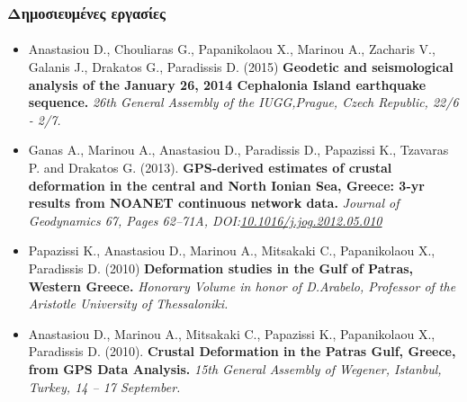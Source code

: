 
\begin{frame}
  \frametitle{Δημοσιευμένες εργασίες}
  \framesubtitle{}

  
\begin{scriptsize}
    \begin{itemize}
\item[\faFile] Anastasiou D., Chouliaras G., Papanikolaou X., Marinou A., Zacharis V., Galanis J., Drakatos G., Paradissis D. (2015) \textbf{Geodetic and seismological analysis of the January 26, 2014 Cephalonia Island earthquake sequence.}  \textit{26th General Assembly of the IUGG,Prague, Czech Republic, 22/6 - 2/7.}\\
  \item[\faFile] Ganas A., Marinou A., Anastasiou D., Paradissis D., Papazissi K., Tzavaras P. and Drakatos G. (2013). \textbf{GPS-derived estimates of crustal deformation in the central and North Ionian Sea, Greece: 3-yr results from NOANET continuous network data.} \textit{Journal of Geodynamics 67, Pages 62–71A, DOI:\url{10.1016/j.jog.2012.05.010}}\\
    \item[\faFile] Papazissi K., Anastasiou D., Marinou A., Mitsakaki C., Papanikolaou X., Paradissis D. (2010) \textbf{Deformation studies in the Gulf of Patras, Western Greece.} \textit{Honorary Volume in honor of D.Arabelo, Professor of the Aristotle University of Thessaloniki.}\\
    \item[\faFile] Anastasiou D., Marinou A., Mitsakaki C., Papazissi K., Papanikolaou X., Paradissis D. (2010). \textbf{Crustal Deformation in the Patras Gulf, Greece, from GPS Data Analysis.} \textit{15th General Assembly of Wegener, Istanbul, Turkey, 14 – 17 September.}\\
  \end{itemize}
  \end{scriptsize}

\end{frame}
